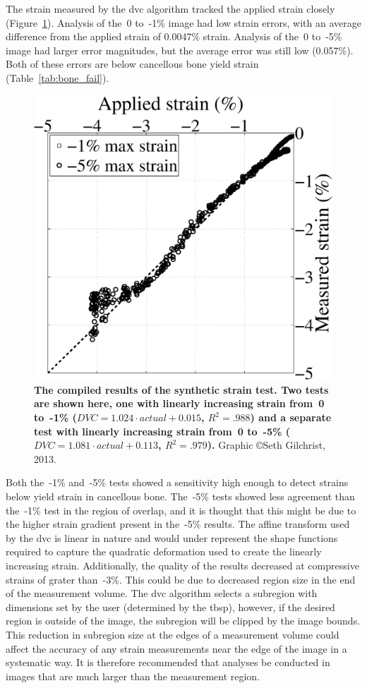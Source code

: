 The strain measured by the \ac{dvc} algorithm tracked the applied strain closely (Figure~\ref{fig:SyntheticStrain}).
Analysis of the~0 to~-1\% image had low strain errors, with an average difference from the applied strain of 0.0047\% strain.
Analysis of the~0 to~-5\% image had larger error magnitudes, but the average error was still low (0.057\%).
Both of these errors are below cancellous bone yield strain (Table~\ref{tab:bone_fail}).

\begin{figure}
\centering
\includegraphics[width=0.7\linewidth]{./appendixDvc/figures/SyntheticStrain}
\caption[Synthetic strain results]{\textbf{The compiled results of the synthetic strain test. Two tests are shown here, one with linearly increasing strain from~0 to~-1\% ($DVC = 1.024 \cdot actual+0.015$, $R^2 = .988$) and a separate test with linearly increasing strain from~0 to~-5\% ($DVC = 1.081 \cdot actual+0.113$, $R^2 = .979$).} Graphic \copyright Seth Gilchrist, 2013.}
\label{fig:SyntheticStrain}
\end{figure}

Both the~-1\% and~-5\% tests showed a sensitivity high enough to detect strains below yield strain in cancellous bone.
The~-5\% tests showed less agreement than the~-1\% test in the region of overlap, and it is thought that this might be due to the higher strain gradient present in the~-5\% results.
The affine transform used by the \ac{dvc} is linear in nature and would under represent the shape functions required to capture the quadratic deformation used to create the linearly increasing strain.
Additionally, the quality of the results decreased at compressive strains of grater than~-3\%.
This could be due to decreased region size in the end of the measurement volume.
The \ac{dvc} algorithm selects a subregion with dimensions set by the user (determined by the \ac{tbsp}), however, if the desired region is outside of the image, the subregion will be clipped by the image bounds.
This reduction in subregion size at the edges of a measurement volume could affect the accuracy of any strain measurements near the edge of the image in a systematic way.
It is therefore recommended that analyses be conducted in images that are much larger than the measurement region.

